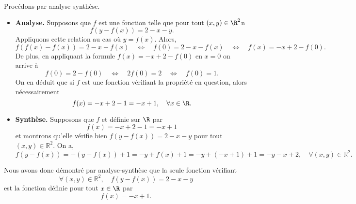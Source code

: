 Procédons par analyse-synthèse.
 \begin{itemize}
 \item \textbf{Analyse.} Supposons que $f$ est une fonction telle que pour tout $(x,y) \in \R^2$n
 \[f(y - f(x)) = 2 - x - y.\]
 Appliquons cette relation au cas où $y =f(x)$. Alors,
 \[f(f(x) - f(x)) = 2 - x - f(x) \quad \Leftrightarrow \quad f(0) = 2 - x - f(x) \quad \Leftrightarrow \quad f(x) = -x + 2 - f(0).\]
 De plus, en appliquant la formule $f(x) = -x+2-f(0)$ en $x=0$ on arrive à 
 \[f(0) = 2 - f(0) \quad \Leftrightarrow \quad 2 f(0) = 2 \quad \Leftrightarrow \quad  f(0) = 1.\]
 On en déduit que si $f$ est une fonction vérifiant la propriété en question, alors nécessairement
 \[ f(x) =  -x + 2 - 1 = -x+1, \quad \forall x\in \R.\]
  \item \textbf{Synthèse.} Supposons que $f$ et définie sur $\R$ par
  \[ f(x) =  -x + 2 - 1 = -x+1\]
  et montrons qu'elle vérifie bien $f(y-f(x))=2-x-y$ pour tout $(x,y)\in\mathbb R^2$. On a,
  \[ f(y-f(x))= -(y-f(x)) + 1 = -y+f(x)+1 = -y + (-x+1) + 1 = -y - x +2, \quad \forall (x,y)\in\mathbb R^2.\]
 \end{itemize}
 Nous avons donc démontré par analyse-synthèse que la seule fonction vérifiant 
 $$\forall (x,y)\in\mathbb R^2, \quad  f(y-f(x))=2-x-y$$
 est la fonction définie pour tout $x\in \R$ par
   \[ f(x)  = -x+1.\]